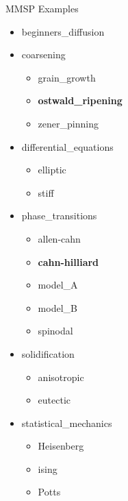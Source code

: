 \documentclass{beamer}
\begin{document}
\begin{frame}{MMSP Examples}
  \begin{minipage}{0.45\textwidth}
  	\begin{itemize}
  	\item beginners\_diffusion
  	\item coarsening
  	\begin{itemize}
	  \item grain\_growth
	  \item \textbf{ostwald\_ripening}
	  \item zener\_pinning
  	\end{itemize}
  	\item differential\_equations
  	\begin{itemize}
	  \item elliptic
	  \item stiff
  	\end{itemize}
  	
    \end{itemize}
  \end{minipage}
  \qquad
  \begin{minipage}{0.45\textwidth}
  \begin{itemize}
    \item phase\_transitions
  	\begin{itemize}
	  \item allen-cahn
	  \item \textbf{cahn-hilliard}
	  \item model\_A
	  \item model\_B
	  \item spinodal
  	\end{itemize}
  	\item solidification
  	\begin{itemize}
	  \item anisotropic
	  \item eutectic
  	\end{itemize}
  	\item statistical\_mechanics
  	\begin{itemize}
	  \item Heisenberg
	  \item ising
	  \item Potts
  	\end{itemize}
  \end{itemize}
  \end{minipage}  
\end{frame}
\end{document}
